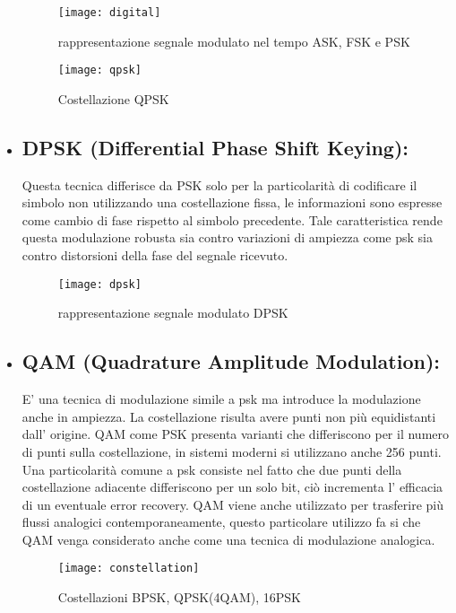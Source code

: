\begin{itemize}
  \begin{figure}[h]
  	\begin{minipage}[b]{.5\columnwidth}
  		\texttt{[image: digital]}
  		\caption{rappresentazione segnale modulato nel tempo ASK, FSK e PSK \cite{digit}}\label{fig:1}
  	\end{minipage}\hfill
  \begin{minipage}[b]{.35\columnwidth}
  	\texttt{[image: qpsk]}
  	\caption{Costellazione QPSK \cite{qpsk}}\label{fig:1}
  \end{minipage}\hfill
\end{figure}
  \item \subsection{DPSK (Differential Phase Shift Keying): } Questa tecnica differisce da PSK solo per la particolarità di codificare il simbolo non utilizzando una costellazione fissa, le informazioni sono espresse come cambio di fase rispetto al simbolo precedente. Tale caratteristica rende questa modulazione robusta sia contro variazioni di ampiezza come psk sia contro distorsioni della fase del segnale ricevuto.
  \begin{figure}[h]
  	\centering
  	\texttt{[image: dpsk]}
  	\caption{rappresentazione segnale modulato DPSK \cite{dpsk}}\label{fig:1}
  \end{figure}
    
  \item \subsection{QAM (Quadrature Amplitude Modulation): } E' una tecnica di modulazione simile a psk ma introduce la modulazione anche in ampiezza. La costellazione risulta avere punti non più equidistanti dall' origine. QAM come PSK presenta varianti che differiscono per il numero di punti sulla costellazione, in sistemi moderni si utilizzano anche 256 punti. Una particolarità comune a psk consiste nel fatto che due punti della costellazione adiacente differiscono per un solo bit, ciò incrementa l' efficacia di un eventuale error recovery. QAM viene anche utilizzato per trasferire più flussi analogici contemporaneamente, questo particolare utilizzo fa si che QAM venga considerato anche come una tecnica di modulazione analogica. 
  \cite{qam}
  
  \begin{figure}[h]
	\centering
	\texttt{[image: constellation]}
	\caption{Costellazioni BPSK, QPSK(4QAM), 16PSK \cite{psk-constellation}}\label{fig:1}
  \end{figure} 
  \end{itemize}


